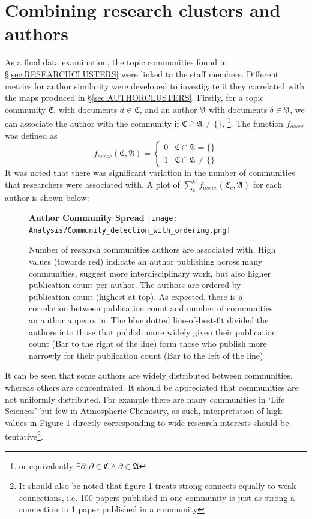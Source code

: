\section{Combining research clusters and authors}
As a final data examination, the topic communities found in  \S\ref{sec:RESEARCHCLUSTERS} were linked to the staff members. Different metrics for author similarity were developed to investigate if they correlated with the maps produced in \S\ref{sec:AUTHORCLUSTERS}.
Firstly, for a topic community $\mathfrak{C}$, with documents $d \in \mathfrak{C}$, and an author $\mathfrak{A}$ with documents $\delta \in \mathfrak{A}$, we can associate the author with the community if $\mathfrak{C} \cap \mathfrak{A} \neq \{ \}$, \footnote{or equivalently $\exists  \partial : \partial \in \mathfrak{C} \wedge \partial \in \mathfrak{A} $}. The function $f_{assoc}$ was defined as 
\[ 
f_{assoc}\left( \mathfrak{C} , \mathfrak{A} \right) = \begin{cases} 
      0 & \mathfrak{C} \cap \mathfrak{A} = \{ \} \\
      1 & \mathfrak{C} \cap \mathfrak{A} \neq \{ \} 
   \end{cases}
\]
It was noted that there was significant variation in the number of communities that researchers were associated with. A plot of $\sum_c^C f_{assoc} \left( \mathfrak{C}_c , \mathfrak{A} \right)$ for each author is shown below:
\begin{center}
\begin{figure}[H]
  \centering
  \textbf{Author Community Spread}
    \texttt{[image: Analysis/Community\_detection\_with\_ordering.png]}
    \caption[Author community Spread]{Number of research communities authors are associated with. High values (towards red) indicate an author publishing across many communities, suggest more interdisciplinary work, but also higher publication count per author. The authors are ordered by publication count (highest at top). As expected, there is a correlation between publication count and number of communities an author appears in. The blue dotted line-of-best-fit divided the authors into those that publish more widely given their publication count (Bar to the right of the line) form those who publish more narrowly for their publication count (Bar to the left of the line)}
\label{fig:commbar}

\end{figure} 
\end{center}
It can be seen that some authors are widely distributed between communities, whereas others are concentrated.
It should be appreciated that communities are not uniformly distributed. For example there are many communities in `Life Sciences' but few in Atmospheric Chemistry, as such, interpretation of high values in Figure \ref{fig:commbar} directly corresponding to wide research interests should be tentative\footnote{It should also be noted that figure \ref{fig:commbar} treats strong connects equally to weak connections, i.e. 100 papers published in one community is just as strong a connection to 1 paper published in a community}.

